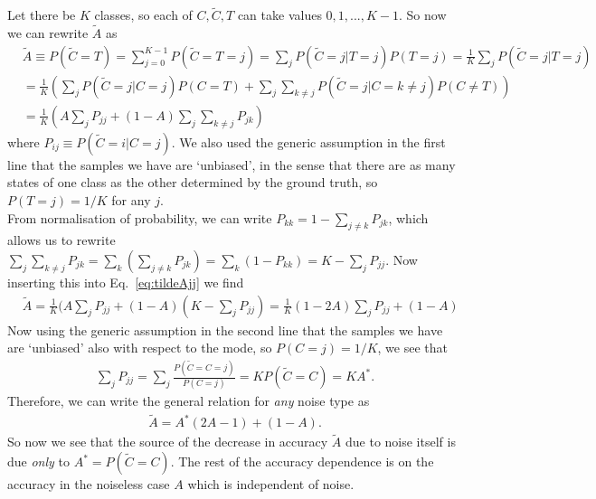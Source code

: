 \documentclass[onecolumn,prx, superscriptaddress,longbibliography,margin=1mm 11pt]{revtex4-2}
\begin{document}
Let there be $K$ classes,  so each of $C, \tilde{C}, T$ can take values $0, 1,...,K-1$.  So now we can rewrite $\tilde{A}$ as 
\begin{align} \label{eq:tildeAjj}
& \tilde{A} \equiv P(\tilde{C}=T)=\sum_{j=0}^{K-1}  P(\tilde{C}=T=j)=\sum_j P(\tilde{C}=j|T=j)P(T=j)=\frac{1}{K} \sum_j P(\tilde{C}=j|T=j) \nonumber \\
&=\frac{1}{K}\left(\sum_{j} P(\tilde{C}=j|C=j)P(C=T)+\sum_j\sum_{k \neq j} P(\tilde{C}=j|C=k\neq j)P(C \neq T)\right) \nonumber \\
&=\frac{1}{K}\left(A\sum_{j} P_{jj}+(1-A) \sum_j \sum_{k \neq j} P_{jk} \right) 
\end{align}
where $P_{ij} \equiv P(\tilde{C}=i|C=j)$.  We also used the generic assumption in the first line that the samples we have are `unbiased', in the sense that there are as many states of one class as the other determined by the ground truth,  so $P(T=j)=1/K$ for any $j$.  \\

From normalisation of probability,  we can write $P_{kk}=1-\sum_{j \neq k} P_{jk}$,  which allows us to rewrite $\sum_j \sum_{k\neq j}P_{jk}= \sum_{k} (\sum_{j \neq k}  P_{jk})=\sum_k (1-P_{kk})=K-\sum_j P_{jj}$.  Now inserting this into Eq.~\eqref{eq:tildeAjj} we find
\begin{align}
&\tilde{A}=\frac{1}{K}(A \sum_j P_{jj}+(1-A)(K-\sum_j P_{jj})=\frac{1}{K}(1-2A)\sum_j P_{jj}+(1-A)
\end{align}
Now using the generic assumption in the second line that the samples we have are `unbiased' also with respect to the mode,  so $P(C=j)=1/K$,  we see that 
\begin{align}
\sum_j P_{jj}=\sum_j\frac{P(\tilde{C}=C=j)}{P(C=j)}=KP(\tilde{C}=C)=KA^*.
\end{align}
Therefore,  we can write the general relation for \textit{any} noise type as 
\begin{align} \label{eq:AtildeA}
\tilde{A}=A^*(2A-1)+(1-A).
\end{align}
So now we see that the source of the decrease in accuracy $\tilde{A}$ due to noise itself is due \textit{only} to $A^*=P(\tilde{C}=C)$.  The rest of the accuracy dependence is on the accuracy in the noiseless case $A$ which is independent of noise.  \\
\end{document}
